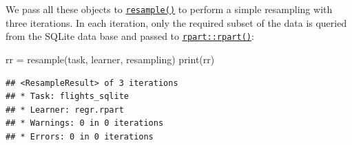 \documentclass[
]{scrbook}
\newenvironment{Shaded}{\begin{snugshade}}{\end{snugshade}}
\newcommand{\AttributeTok}[1]{\textcolor[rgb]{0.77,0.63,0.00}{#1}}
\newcommand{\DecValTok}[1]{\textcolor[rgb]{0.00,0.00,0.81}{#1}}
\newcommand{\FloatTok}[1]{\textcolor[rgb]{0.00,0.00,0.81}{#1}}
\newcommand{\FunctionTok}[1]{\textcolor[rgb]{0.00,0.00,0.00}{#1}}
\newcommand{\NormalTok}[1]{#1}
\newcommand{\OtherTok}[1]{\textcolor[rgb]{0.56,0.35,0.01}{#1}}
\newcommand{\SpecialCharTok}[1]{\textcolor[rgb]{0.00,0.00,0.00}{#1}}
\newcommand{\StringTok}[1]{\textcolor[rgb]{0.31,0.60,0.02}{#1}}
\renewenvironment{Shaded} {\begin{snugshade}\small} {\end{snugshade}}
\begin{document}
\begin{Shaded}
\end{Shaded}

We pass all these objects to \href{https://mlr3.mlr-org.com/reference/resample.html}{\texttt{resample()}} to perform a simple resampling with three iterations.
In each iteration, only the required subset of the data is queried from the SQLite data base and passed to \href{https://www.rdocumentation.org/packages/rpart/topics/rpart}{\texttt{rpart::rpart()}}:

\begin{Shaded}
\begin{Highlighting}[]
\NormalTok{rr }\OtherTok{=} \FunctionTok{resample}\NormalTok{(task, learner, resampling)}
\FunctionTok{print}\NormalTok{(rr)}
\end{Highlighting}
\end{Shaded}

\begin{verbatim}
## <ResampleResult> of 3 iterations
## * Task: flights_sqlite
## * Learner: regr.rpart
## * Warnings: 0 in 0 iterations
## * Errors: 0 in 0 iterations
\end{verbatim}

\begin{Shaded}
\end{Shaded}
\end{document}
